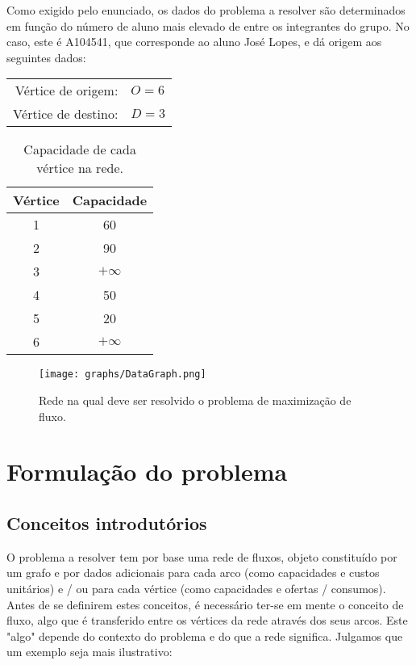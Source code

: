 \documentclass[12pt, a4paper, titlepage]{article}
\begin{document}
Como exigido pelo enunciado, os dados do problema a resolver são determinados em função do número de
aluno mais elevado de entre os integrantes do grupo. No caso, este é A104541, que corresponde ao
aluno José Lopes, e dá origem aos seguintes dados:

\begin{center}
    \begin{tabular}{rl}
        Vértice de origem:  & $O = 6$ \\
        Vértice de destino: & $D = 3$
    \end{tabular}
\end{center}

\begin{table}[H]
    \begin{center}
        \begin{tabular}{c|c}
            Vértice & Capacidade \\
            \hline
            1 & 60        \\
            2 & 90        \\
            3 & $+\infty$ \\
            4 & 50        \\
            5 & 20        \\
            6 & $+\infty$
        \end{tabular}
    \end{center}
    \caption{Capacidade de cada vértice na rede.}
    \label{vertices-capacities}
\end{table}

\begin{figure}[H]
    \centering
    \texttt{[image: graphs/DataGraph.png]}
    \caption{Rede na qual deve ser resolvido o problema de maximização de fluxo.}
    \label{data-graph}
\end{figure}

\pagebreak
\section{Formulação do problema}

\subsection{Conceitos introdutórios}

O problema a resolver tem por base uma rede de fluxos, objeto constituído por um grafo e por dados
adicionais para cada arco (como capacidades e custos unitários) e / ou para cada vértice (como
capacidades e ofertas / consumos). Antes de se definirem estes conceitos, é necessário ter-se em
mente o conceito de fluxo, algo que é transferido entre os vértices da rede através dos seus arcos.
Este "algo"{} depende do contexto do problema e do que a rede significa. Julgamos que um exemplo
seja mais ilustrativo:
\end{document}
